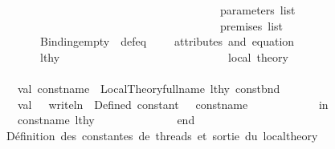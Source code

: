 \begin{isabellebody}
\ \ \ \ \ \ \ \ \ \ \ \ \ \ \ \ \ \ {\isacharbrackleft}{\kern0pt}{\isacharbrackright}{\kern0pt}\ \ \ \ \ \ \ \ \ \ \ \ \ \ \ \ \ \ \ \ \ \ \ \ \ \ \ \ \ \ \ {\isacharparenleft}{\kern0pt}{\isacharasterisk}{\kern0pt}\ parameters\ list\ {\isacharasterisk}{\kern0pt}{\isacharparenright}{\kern0pt}\isanewline
\ \ \ \ \ \ \ \ \ \ \ \ \ \ \ \ \ \ {\isacharbrackleft}{\kern0pt}{\isacharbrackright}{\kern0pt}\ \ \ \ \ \ \ \ \ \ \ \ \ \ \ \ \ \ \ \ \ \ \ \ \ \ \ \ \ \ \ {\isacharparenleft}{\kern0pt}{\isacharasterisk}{\kern0pt}\ premises\ list\ {\isacharasterisk}{\kern0pt}{\isacharparenright}{\kern0pt}\isanewline
\ \ \ \ \ \ \ \ \ \ \ \ \ \ \ \ \ \ {\isacharparenleft}{\kern0pt}{\isacharparenleft}{\kern0pt}Binding{\isachardot}{\kern0pt}empty{\isacharcomma}{\kern0pt}\ {\isacharbrackleft}{\kern0pt}{\isacharbrackright}{\kern0pt}{\isacharparenright}{\kern0pt}{\isacharcomma}{\kern0pt}\ def{\isacharunderscore}{\kern0pt}eq{\isacharparenright}{\kern0pt}\ \ \ \ {\isacharparenleft}{\kern0pt}{\isacharasterisk}{\kern0pt}\ attributes\ and\ equation\ {\isacharasterisk}{\kern0pt}{\isacharparenright}{\kern0pt}\isanewline
\ \ \ \ \ \ \ \ \ \ \ \ \ \ \ \ \ \ lthy\ \ \ \ \ \ \ \ \ \ \ \ \ \ \ \ \ \ \ \ \ \ \ \ \ \ \ \ \ {\isacharparenleft}{\kern0pt}{\isacharasterisk}{\kern0pt}\ local\ theory\ {\isacharasterisk}{\kern0pt}{\isacharparenright}{\kern0pt}\isanewline
\ \ \ \ \ \ \ \ \ \ \ \ \ \ \isanewline
\ \ \ \ \ \ \ \ \ \ \ \ \ \ val\ const{\isacharunderscore}{\kern0pt}name\ {\isacharequal}{\kern0pt}\ Local{\isacharunderscore}{\kern0pt}Theory{\isachardot}{\kern0pt}full{\isacharunderscore}{\kern0pt}name\ lthy{\isacharprime}{\kern0pt}\ const{\isacharunderscore}{\kern0pt}bnd\isanewline
\ \ \ \ \ \ \ \ \ \ \ \ \ \ val\ {\isacharunderscore}{\kern0pt}\ {\isacharequal}{\kern0pt}\ writeln\ {\isacharparenleft}{\kern0pt}{\isachardoublequote}{\kern0pt}{\isasymcheckmark}\ Defined\ constant{\isacharcolon}{\kern0pt}\ {\isachardoublequote}{\kern0pt}\ {\isacharcircum}{\kern0pt}\ const{\isacharunderscore}{\kern0pt}name{\isacharparenright}{\kern0pt}\isanewline
\ \ \ \ \ \ \ \ \ \ \ \ in\isanewline
\ \ \ \ \ \ \ \ \ \ \ \ \ \ {\isacharparenleft}{\kern0pt}const{\isacharunderscore}{\kern0pt}name{\isacharcomma}{\kern0pt}\ lthy{\isacharprime}{\kern0pt}{\isacharparenright}{\kern0pt}\ \ \isanewline
\ \ \ \ \ \ \ \ \ \ \ \ end\isanewline
\ \ \ \ \ \ \ \ \ \ {\isacharparenleft}{\kern0pt}{\isacharasterisk}{\kern0pt}\ {}{\isachardot}{\kern0pt}\ Définition\ des\ constantes\ de\ threads{\isacharcomma}{\kern0pt}\ et\ sortie\ du\ local{\isacharunderscore}{\kern0pt}theory\ {\isacharasterisk}{\kern0pt}{\isacharparenright}{\kern0pt}\isanewline

\end{isabellebody}
